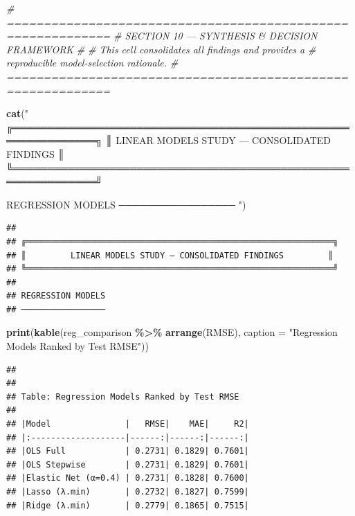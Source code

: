 \documentclass[
]{article}
\newenvironment{Shaded}{\begin{snugshade}}{\end{snugshade}}
\newcommand{\AttributeTok}[1]{\textcolor[rgb]{0.13,0.29,0.53}{#1}}
\newcommand{\CommentTok}[1]{\textcolor[rgb]{0.56,0.35,0.01}{\textit{#1}}}
\newcommand{\FunctionTok}[1]{\textcolor[rgb]{0.13,0.29,0.53}{\textbf{#1}}}
\newcommand{\NormalTok}[1]{#1}
\newcommand{\SpecialCharTok}[1]{\textcolor[rgb]{0.81,0.36,0.00}{\textbf{#1}}}
\newcommand{\StringTok}[1]{\textcolor[rgb]{0.31,0.60,0.02}{#1}}
\begin{document}
\begin{Shaded}
\begin{Highlighting}[]
\CommentTok{\# ============================================================}
\CommentTok{\#  SECTION 10 — SYNTHESIS \& DECISION FRAMEWORK}
\CommentTok{\#}
\CommentTok{\#  This cell consolidates all findings and provides a}
\CommentTok{\#  reproducible model{-}selection rationale.}
\CommentTok{\# ============================================================}

\FunctionTok{cat}\NormalTok{(}\StringTok{"}
\StringTok{╔══════════════════════════════════════════════════════════════╗}
\StringTok{║         LINEAR MODELS STUDY — CONSOLIDATED FINDINGS         ║}
\StringTok{╚══════════════════════════════════════════════════════════════╝}

\StringTok{REGRESSION MODELS}
\StringTok{─────────────────}
\StringTok{"}\NormalTok{)}
\end{Highlighting}
\end{Shaded}

\begin{verbatim}
## 
## ╔══════════════════════════════════════════════════════════════╗
## ║         LINEAR MODELS STUDY — CONSOLIDATED FINDINGS         ║
## ╚══════════════════════════════════════════════════════════════╝
## 
## REGRESSION MODELS
## ─────────────────
\end{verbatim}

\begin{Shaded}
\begin{Highlighting}[]
\FunctionTok{print}\NormalTok{(}\FunctionTok{kable}\NormalTok{(reg\_comparison }\SpecialCharTok{\%\textgreater{}\%} \FunctionTok{arrange}\NormalTok{(RMSE),}
            \AttributeTok{caption =} \StringTok{"Regression Models Ranked by Test RMSE"}\NormalTok{))}
\end{Highlighting}
\end{Shaded}

\begin{verbatim}
## 
## 
## Table: Regression Models Ranked by Test RMSE
## 
## |Model               |   RMSE|    MAE|     R2|
## |:-------------------|------:|------:|------:|
## |OLS Full            | 0.2731| 0.1829| 0.7601|
## |OLS Stepwise        | 0.2731| 0.1829| 0.7601|
## |Elastic Net (α=0.4) | 0.2731| 0.1828| 0.7600|
## |Lasso (λ.min)       | 0.2732| 0.1827| 0.7599|
## |Ridge (λ.min)       | 0.2779| 0.1865| 0.7515|
\end{verbatim}
\end{document}
